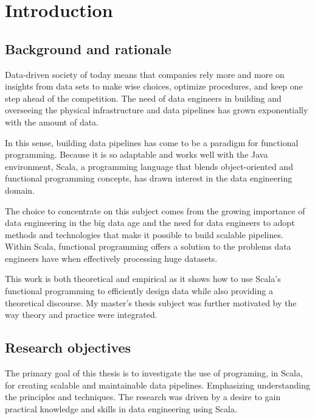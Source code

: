 \setcounter{page}{1}
\chapter*{Introduction}

\section*{Background and rationale}

Data-driven society of today means that companies rely more and more on insights from data sets to make wise choices, optimize procedures, and keep one step ahead of the competition. The need of data engineers in building and overseeing the physical infrastructure and data pipelines has grown exponentially with the amount of data.

In this sense, building data pipelines has come to be a paradigm for functional programming. Because it is so adaptable and works well with the Java environment, Scala, a programming language that blends object-oriented and functional programming concepts, has drawn interest in the data engineering domain.

The choice to concentrate on this subject comes from the growing importance of data engineering in the big data age and the need for data engineers to adopt methods and technologies that make it possible to build scalable pipelines. Within Scala, functional programming offers a solution to the problems data engineers have when effectively processing huge datasets.

This work is both theoretical and empirical as it shows how to use Scala's functional programming to efficiently design data while also providing a theoretical discourse. My master's thesis subject was further motivated by the way theory and practice were integrated.

\section*{Research objectives}

The primary goal of this thesis is to investigate the use of programing, in Scala, for creating scalable and maintainable data pipelines. Emphasizing understanding the principles and techniques. The research was driven by a desire to gain practical knowledge and skills in data engineering using Scala.

